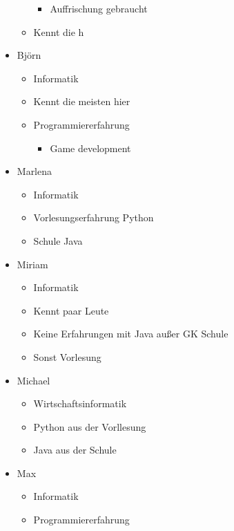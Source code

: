 \begin{itemize}
\begin{itemize}
    \begin{itemize}
    \tightlist
    \item
      Auffrischung gebraucht
    \end{itemize}
  \item
    Kennt die h
  \end{itemize}
\item
  Björn

  \begin{itemize}
  \tightlist
  \item
    Informatik
  \item
    Kennt die meisten hier
  \item
    Programmiererfahrung

    \begin{itemize}
    \tightlist
    \item
      Game development
    \end{itemize}
  \end{itemize}
\item
  Marlena

  \begin{itemize}
  \tightlist
  \item
    Informatik
  \item
    Vorlesungserfahrung Python
  \item
    Schule Java
  \end{itemize}
\item
  Miriam

  \begin{itemize}
  \tightlist
  \item
    Informatik
  \item
    Kennt paar Leute
  \item
    Keine Erfahrungen mit Java außer GK Schule
  \item
    Sonst Vorlesung
  \end{itemize}
\item
  Michael

  \begin{itemize}
  \tightlist
  \item
    Wirtschaftsinformatik
  \item
    Python aus der Vorllesung
  \item
    Java aus der Schule
  \end{itemize}
\item
  Max

  \begin{itemize}
  \tightlist
  \item
    Informatik
  \item
    Programmiererfahrung


\end{itemize}
\end{itemize}
